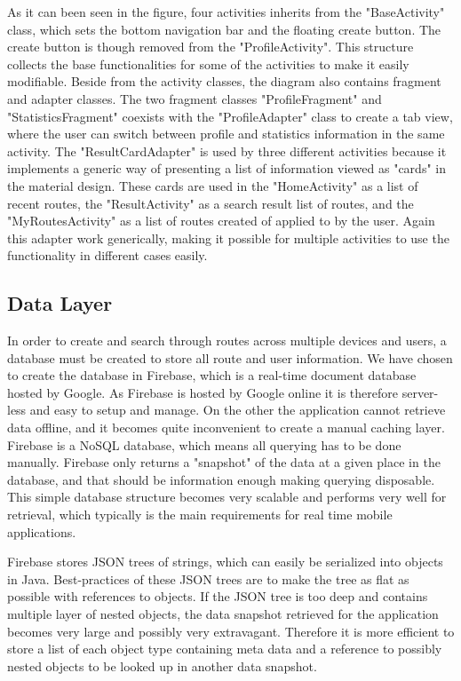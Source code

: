 As it can been seen in the figure, four activities inherits from the "BaseActivity" class, which sets the bottom navigation bar and the floating create button. The create button is though removed from the "ProfileActivity". 
This structure collects the base functionalities for some of the activities to make it easily modifiable.
Beside from the activity classes, the diagram also contains fragment and adapter classes. The two fragment classes "ProfileFragment" and "StatisticsFragment" coexists with the "ProfileAdapter" class to create a tab view, where the user can switch between profile and statistics information in the same activity. The "ResultCardAdapter" is used by three different activities because it implements a generic way of presenting a list of information viewed as "cards" in the material design. These cards are used in the "HomeActivity" as a list of recent routes, the "ResultActivity" as a search result list of routes, and the "MyRoutesActivity" as a list of routes created of applied to by the user. Again this adapter work generically, making it possible for multiple activities to use the functionality in different cases easily.

\subsection{Data Layer}

In order to create and search through routes across multiple devices and users, a database must be created to store all route and user information.
We have chosen to create the database in Firebase, which is a real-time document database hosted by Google. As Firebase is hosted by Google online it is therefore server-less and easy to setup and manage. On the other the application cannot retrieve data offline, and it becomes quite inconvenient to create a manual caching layer. Firebase is a NoSQL database, which means all querying has to be done manually. Firebase only returns a "snapshot" of the data at a given place in the database, and that should be information enough making querying disposable. This simple database structure becomes very scalable and performs very well for retrieval, which typically is the main requirements for real time mobile applications.

Firebase stores JSON trees of strings, which can easily be serialized into objects in Java. Best-practices of these JSON trees are to make the tree as flat as possible with references to objects. If the JSON tree is too deep and contains multiple layer of nested objects, the data snapshot retrieved for the application becomes very large and possibly very extravagant. Therefore it is more efficient to store a list of each object type containing meta data and a reference to possibly nested objects to be looked up in another data snapshot.

